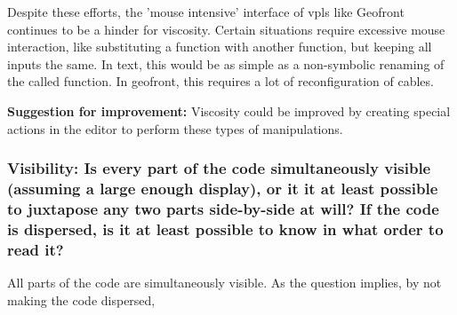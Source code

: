 Despite these efforts, the 'mouse intensive' interface of vpls like Geofront continues to be a hinder for viscosity.
Certain situations require excessive mouse interaction, like substituting a function with another function, but keeping all inputs the same.
In text, this would be as simple as a non-symbolic renaming of the called function.
In geofront, this requires a lot of reconfiguration of cables. 

\textbf{Suggestion for improvement:} Viscosity could be improved by creating special actions in the editor to perform these types of manipulations.  


\subsubsection*{Visibility: Is every part of the code simultaneously visible (assuming a large enough display), or it it at least possible to juxtapose any two parts side-by-side at will? If the code is dispersed, is it at least possible to know in what order to read it?}

All parts of the code are simultaneously visible. 
As the question implies, by not making the code dispersed, 














